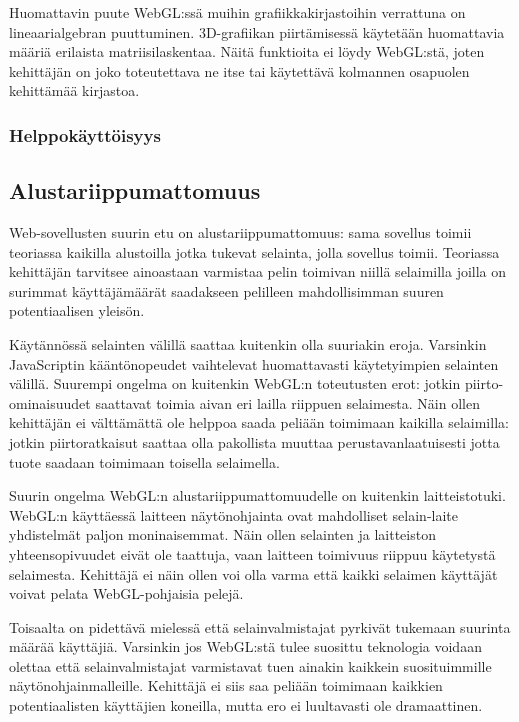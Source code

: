 Huomattavin puute WebGL:ssä muihin grafiikkakirjastoihin verrattuna on lineaarialgebran puuttuminen. 3D-grafiikan piirtämisessä käytetään huomattavia määriä erilaista matriisilaskentaa. Näitä funktioita ei löydy WebGL:stä, joten kehittäjän on joko toteutettava ne itse tai käytettävä kolmannen osapuolen kehittämää kirjastoa.

\subsubsection{Helppokäyttöisyys}

\subsection{Alustariippumattomuus}

Web-sovellusten suurin etu on alustariippumattomuus: sama sovellus toimii teoriassa kaikilla alustoilla jotka tukevat selainta, jolla sovellus toimii. Teoriassa kehittäjän tarvitsee ainoastaan varmistaa pelin toimivan niillä selaimilla joilla on surimmat käyttäjämäärät saadakseen pelilleen mahdollisimman suuren potentiaalisen yleisön.

Käytännössä selainten välillä saattaa kuitenkin olla suuriakin eroja. Varsinkin JavaScriptin kääntönopeudet vaihtelevat huomattavasti käytetyimpien selainten välillä\cite{hoetzlein}. Suurempi ongelma on kuitenkin WebGL:n toteutusten erot: jotkin piirto-ominaisuudet saattavat toimia aivan eri lailla riippuen selaimesta\cite{voutilainen}. Näin ollen kehittäjän ei välttämättä ole helppoa saada peliään toimimaan kaikilla selaimilla: jotkin piirtoratkaisut saattaa olla pakollista muuttaa perustavanlaatuisesti jotta tuote saadaan toimimaan toisella selaimella.

Suurin ongelma WebGL:n alustariippumattomuudelle on kuitenkin laitteistotuki. WebGL:n käyttäessä laitteen näytönohjainta ovat mahdolliset selain-laite yhdistelmät paljon moninaisemmat. Näin ollen selainten ja laitteiston yhteensopivuudet eivät ole taattuja, vaan laitteen toimivuus riippuu käytetystä selaimesta\cite{mozillaBlacklist}\cite{webgl_supported}. Kehittäjä ei näin ollen voi olla varma että kaikki selaimen käyttäjät voivat pelata WebGL-pohjaisia pelejä.

Toisaalta on pidettävä mielessä että selainvalmistajat pyrkivät tukemaan suurinta määrää käyttäjiä. Varsinkin jos WebGL:stä tulee suosittu teknologia voidaan olettaa että selainvalmistajat varmistavat tuen ainakin kaikkein suosituimmille näytönohjainmalleille. Kehittäjä ei siis saa peliään toimimaan kaikkien potentiaalisten käyttäjien koneilla, mutta ero ei luultavasti ole dramaattinen.